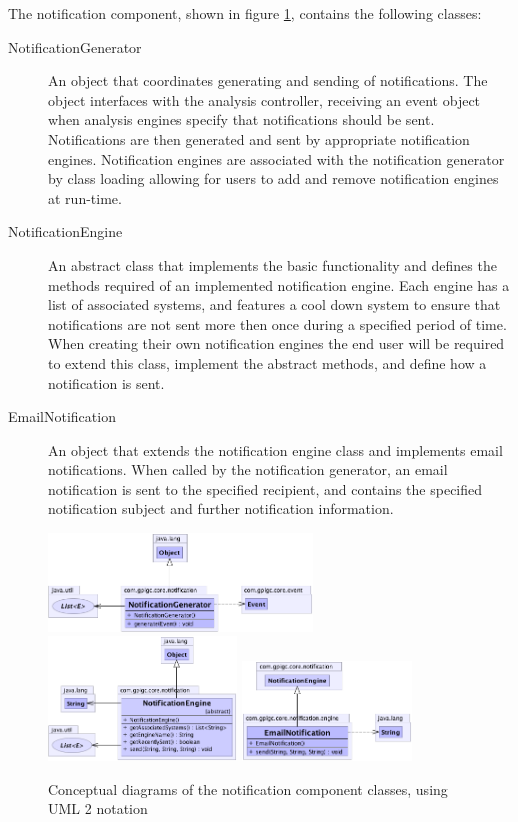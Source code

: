 \documentclass[10pt,a4paper]{article}
\begin{document}
The notification component, shown in figure
\ref{fig:notificationComponent}, contains the following classes:

\begin{description}
  \item [NotificationGenerator] An object that coordinates generating and
    sending of notifications. The object interfaces with the analysis
    controller, receiving an event object when analysis engines specify that
    notifications should be sent. Notifications are then generated and sent by
    appropriate notification engines. Notification engines are associated with
    the notification generator by class loading allowing for users to add and
    remove notification engines at run-time.

  \item [NotificationEngine] An abstract class that implements the basic
    functionality and defines the methods required of an implemented
    notification engine. Each engine has a list of associated systems, and 
    features a cool down system to ensure that notifications are not sent
    more then once during a specified period of time. When creating their
    own notification engines the end user will be required to extend this
    class, implement the abstract methods, and define how a notification
    is sent.

  \item [EmailNotification] An object that extends the notification engine
    class and implements email notifications. When called by the notification
    generator, an email notification is sent to the specified recipient, and 
    contains the specified notification subject and further notification
    information.
\end{description}
 
\begin{figure}[ht!]
  \centering
  \includegraphics[width= 7cm]{images/Notification/NotificationGenerator.png}
  \includegraphics[width= 5cm]{images/Notification/NotificationEngine.png}
  \includegraphics[width= 4.5cm]{images/Notification/EmailNotification.png}
  \caption{Conceptual diagrams of the notification component classes, using 
UML 2 notation}
  \label{fig:notificationComponent}
\end{figure}
\end{document}
